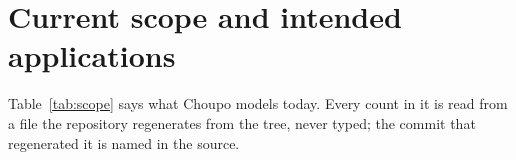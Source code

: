 \documentclass[11pt,a4paper]{article}
\begin{document}
\section{Current scope and intended applications}
\label{sec:scope}

Table~\ref{tab:scope} says what Choupo models today.  Every count in it is
read from a file the repository regenerates from the tree, never typed; the
commit that regenerated it is named in the source.
\end{document}
